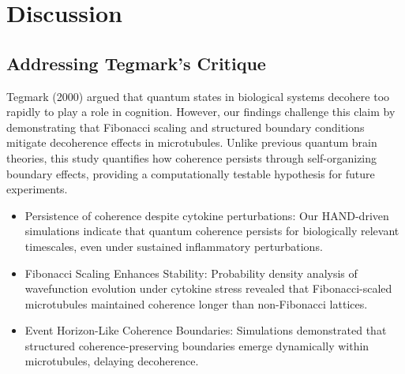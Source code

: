 \section{Discussion}
\subsection{Addressing Tegmark's Critique}
Tegmark (2000) argued that quantum states in biological systems decohere too rapidly to play a role in cognition. However, our findings challenge this claim by demonstrating that Fibonacci scaling and structured boundary conditions mitigate decoherence effects in microtubules. Unlike previous quantum brain theories, this study quantifies how coherence persists through self-organizing boundary effects, providing a computationally testable hypothesis for future experiments.
\begin{itemize}
    \item Persistence of coherence despite cytokine perturbations: Our HAND-driven simulations indicate that quantum coherence persists for biologically relevant timescales, even under sustained inflammatory perturbations.
    \item Fibonacci Scaling Enhances Stability: Probability density analysis of wavefunction evolution under cytokine stress revealed that Fibonacci-scaled microtubules maintained coherence longer than non-Fibonacci lattices.
    \item Event Horizon-Like Coherence Boundaries: Simulations demonstrated that structured coherence-preserving boundaries emerge dynamically within microtubules, delaying decoherence.
\end{itemize}
\sloppy  %
